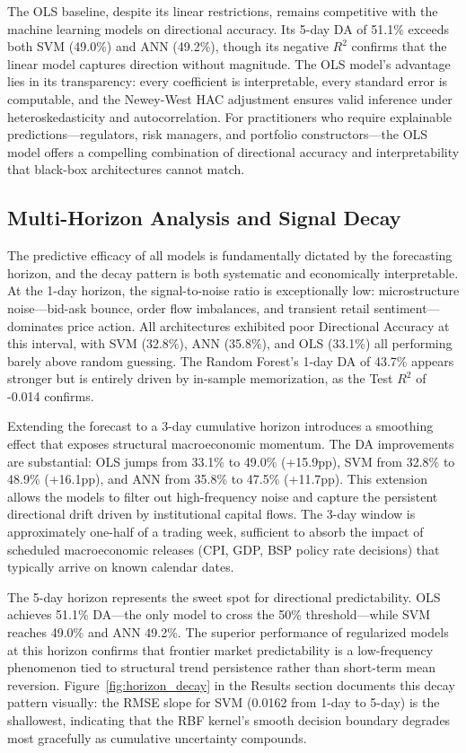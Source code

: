 \documentclass[12pt]{article}
\begin{document}
The OLS baseline, despite its linear restrictions, remains competitive with the machine learning models on directional accuracy. Its 5-day DA of 51.1\% exceeds both SVM (49.0\%) and ANN (49.2\%), though its negative $R^2$ confirms that the linear model captures direction without magnitude. The OLS model's advantage lies in its transparency: every coefficient is interpretable, every standard error is computable, and the Newey-West HAC adjustment ensures valid inference under heteroskedasticity and autocorrelation. For practitioners who require explainable predictions---regulators, risk managers, and portfolio constructors---the OLS model offers a compelling combination of directional accuracy and interpretability that black-box architectures cannot match.

\subsection{Multi-Horizon Analysis and Signal Decay}

The predictive efficacy of all models is fundamentally dictated by the forecasting horizon, and the decay pattern is both systematic and economically interpretable. At the 1-day horizon, the signal-to-noise ratio is exceptionally low: microstructure noise---bid-ask bounce, order flow imbalances, and transient retail sentiment---dominates price action. All architectures exhibited poor Directional Accuracy at this interval, with SVM (32.8\%), ANN (35.8\%), and OLS (33.1\%) all performing barely above random guessing. The Random Forest's 1-day DA of 43.7\% appears stronger but is entirely driven by in-sample memorization, as the Test $R^2$ of -0.014 confirms.

Extending the forecast to a 3-day cumulative horizon introduces a smoothing effect that exposes structural macroeconomic momentum. The DA improvements are substantial: OLS jumps from 33.1\% to 49.0\% (+15.9pp), SVM from 32.8\% to 48.9\% (+16.1pp), and ANN from 35.8\% to 47.5\% (+11.7pp). This extension allows the models to filter out high-frequency noise and capture the persistent directional drift driven by institutional capital flows. The 3-day window is approximately one-half of a trading week, sufficient to absorb the impact of scheduled macroeconomic releases (CPI, GDP, BSP policy rate decisions) that typically arrive on known calendar dates.

The 5-day horizon represents the sweet spot for directional predictability. OLS achieves 51.1\% DA---the only model to cross the 50\% threshold---while SVM reaches 49.0\% and ANN 49.2\%. The superior performance of regularized models at this horizon confirms that frontier market predictability is a low-frequency phenomenon tied to structural trend persistence rather than short-term mean reversion. Figure~\ref{fig:horizon_decay} in the Results section documents this decay pattern visually: the RMSE slope for SVM (0.0162 from 1-day to 5-day) is the shallowest, indicating that the RBF kernel's smooth decision boundary degrades most gracefully as cumulative uncertainty compounds.
\end{document}
